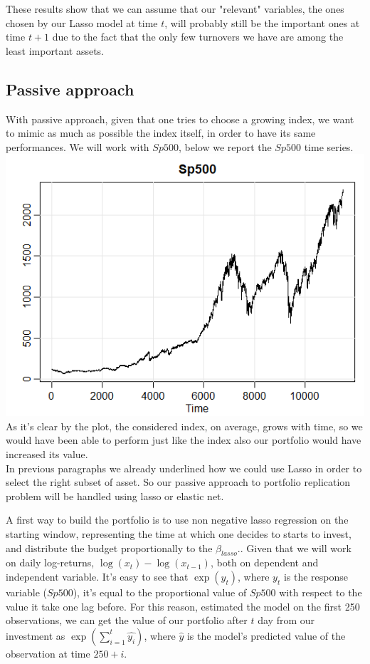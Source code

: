 \documentclass{article}%
\begin{document}
These results show that we can assume that our "relevant" variables, the ones chosen by our Lasso model at time $t$, will probably still be the important ones at time $t+1$ due to the fact that the only few turnovers we have are among the least important assets.


\subsection{Passive approach}

With passive approach, given that one tries to choose a growing index, we want to mimic as much as possible the index itself, in order to have its same performances.
We will work with $Sp500$, below we report the $Sp500$ time series.
\\


\includegraphics[scale=0.75]{sp500}
\\
		
As it's clear by the plot, the considered index, on average, grows with time, so we would have been able to perform just like the index also our portfolio would have increased its value.
\\

In previous paragraphs we already underlined how we could use Lasso in order to select the right subset of asset. So our passive approach to portfolio replication problem will be handled using lasso or elastic net.

A first way to build the portfolio is to use non negative lasso regression on the starting window, representing the time at which one decides to starts to invest, and distribute the budget proportionally to the $\beta_{lasso}$.. Given that we will work on daily log-returns, $\log(x_t)-\log(x_{t-1})$, both on dependent and independent variable. It's easy to see that $\exp(y_t)$, where $y_t$ is the response variable ($Sp500$), it's equal to the proportional value of $Sp500$ with respect to the value it take one lag before. For this reason, estimated the model on the first 250 observations, we can get the value of our portfolio after $t$ day from our investment as $\exp(\sum_{i=1}^t \hat{y_i})$, where $\hat{y}$ is the model's predicted value of the observation at time $250+i$.
\end{document}
